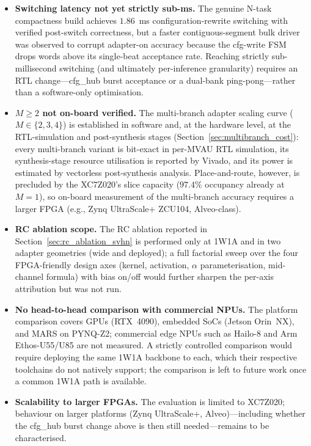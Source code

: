 \documentclass[12pt, a4paper]{report}
\numberwithin{equation}{chapter}
\numberwithin{figure}{chapter}
\numberwithin{table}{chapter}
\numberwithin{algorithm}{chapter}
\begin{document}
\begin{itemize}
    \item \textbf{Switching latency not yet strictly sub-ms.} The genuine N-task compactness build achieves $1.86$~ms configuration-rewrite switching with verified post-switch correctness, but a faster contiguous-segment bulk driver was observed to corrupt adapter-on accuracy because the cfg-write FSM drops words above its single-beat acceptance rate. Reaching strictly sub-millisecond switching (and ultimately per-inference granularity) requires an RTL change---cfg\_hub burst acceptance or a dual-bank ping-pong---rather than a software-only optimisation.
    \item \textbf{$M{\geq}2$ not on-board verified.} The multi-branch adapter scaling curve ($M\in\{2, 3, 4\}$) is established in software and, at the hardware level, at the RTL-simulation and post-synthesis stages (Section~\ref{sec:multibranch_cost}): every multi-branch variant is bit-exact in per-MVAU RTL simulation, its synthesis-stage resource utilisation is reported by Vivado, and its power is estimated by vectorless post-synthesis analysis. Place-and-route, however, is precluded by the XC7Z020's slice capacity ($97.4\%$ occupancy already at $M{=}1$), so on-board measurement of the multi-branch accuracy requires a larger FPGA (e.g., Zynq UltraScale+ ZCU104, Alveo-class).
    \item \textbf{RC ablation scope.} The RC ablation reported in Section~\ref{sec:rc_ablation_svhn} is performed only at 1W1A and in two adapter geometries (wide and deployed); a full factorial sweep over the four FPGA-friendly design axes (kernel, activation, $\alpha$ parameterisation, mid-channel formula) with bias on/off would further sharpen the per-axis attribution but was not run.
    \item \textbf{No head-to-head comparison with commercial NPUs.} The platform comparison covers GPUs (RTX~4090), embedded SoCs (Jetson Orin~NX), and MARS on PYNQ-Z2; commercial edge NPUs such as Hailo-8 and Arm Ethos-U55/U85 are not measured. A strictly controlled comparison would require deploying the same 1W1A backbone to each, which their respective toolchains do not natively support; the comparison is left to future work once a common 1W1A path is available.
    \item \textbf{Scalability to larger FPGAs.} The evaluation is limited to XC7Z020; behaviour on larger platforms (Zynq UltraScale+, Alveo)---including whether the cfg\_hub burst change above is then still needed---remains to be characterised.
\end{itemize}
\end{document}
